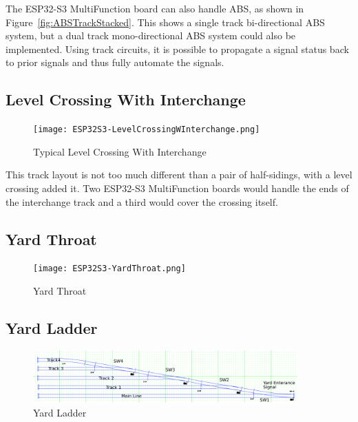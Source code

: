 The ESP32-S3 MultiFunction board can also handle ABS, as shown in 
Figure~\ref{fig:ABSTrackStacked}.  This shows a single track bi-directional 
ABS system, but a dual track mono-directional ABS system could also be 
implemented.  Using track circuits, it is possible to propagate a signal 
status back to prior signals and thus fully automate the signals.

\subsection{Level Crossing With Interchange}
\label{sec:LevelCrossingInterchange}
\begin{figure}[hbpt]\begin{centering}%
\texttt{[image: ESP32S3-LevelCrossingWInterchange.png]}
\caption{Typical Level Crossing With Interchange}
\label{fig:LevelCrossingWInterchange}
\end{centering}\end{figure}

This track layout is not too much different than a pair of half-sidings, with 
a level crossing added it.  Two ESP32-S3 MultiFunction boards would handle the 
ends of the interchange track and a third would cover the crossing itself.


\subsection{Yard Throat}
\label{sec:YardThroat}
\begin{figure}[hbpt]\begin{centering}%
\texttt{[image: ESP32S3-YardThroat.png]}
\caption{Yard Throat}
\label{fig:YardThroat}
\end{centering}\end{figure}

\subsection{Yard Ladder}
\label{sec:YardLadder}
\begin{figure}[hbpt]\begin{centering}%
\includegraphics[width=4in]{ESP32S3-YardLadderAnnotated.png}
\caption{Yard Ladder}
\label{fig:YardLadder}
\end{centering}\end{figure}

